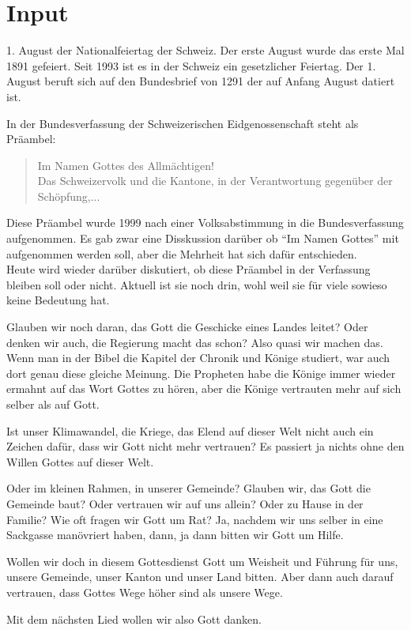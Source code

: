 \documentclass{../../inc/mybib}
\begin{document}
\section{ Input }
\begin{spacing}{1.5}
1. August der Nationalfeiertag der Schweiz. Der erste August wurde das erste Mal 1891 gefeiert. Seit 1993 ist es in der Schweiz ein gesetzlicher Feiertag. Der 1. August beruft sich auf den Bundesbrief von 1291 der auf Anfang August datiert ist.

In der Bundesverfassung der Schweizerischen Eidgenossenschaft steht als Präambel:
\begin{quote}
Im Namen Gottes des Allmächtigen!\\
Das Schweizervolk und die Kantone, in der Verantwortung gegenüber der Schöpfung,...
\end{quote}
Diese Präambel wurde 1999 nach einer Volksabstimmung in die Bundesverfassung aufgenommen. Es gab zwar eine Disskussion darüber ob \enquote{Im Namen Gottes} mit aufgenommen werden soll, aber die Mehrheit hat sich dafür entschieden.\\
Heute wird wieder darüber diskutiert, ob diese Präambel in der Verfassung bleiben soll oder nicht. Aktuell ist sie noch drin, wohl weil sie für viele sowieso keine Bedeutung hat.

Glauben wir noch daran, das Gott die Geschicke eines Landes leitet? Oder denken wir auch, die Regierung macht das schon? Also quasi wir machen das. Wenn man in der Bibel die Kapitel der Chronik und Könige studiert, war auch dort genau diese gleiche Meinung. Die Propheten habe die Könige immer wieder ermahnt auf das Wort Gottes zu hören, aber die Könige vertrauten mehr auf sich selber als auf Gott.

Ist unser Klimawandel, die Kriege, das Elend auf dieser Welt nicht auch ein Zeichen dafür, dass wir Gott nicht mehr vertrauen? Es passiert ja nichts ohne den Willen Gottes auf dieser Welt.

Oder im kleinen Rahmen, in unserer Gemeinde? Glauben wir, das Gott die Gemeinde baut? Oder vertrauen wir auf uns allein? Oder zu Hause in der Familie? Wie oft fragen wir Gott um Rat? Ja, nachdem wir uns selber in eine Sackgasse manövriert haben, dann, ja dann bitten wir Gott um Hilfe.

Wollen wir doch in diesem Gottesdienst Gott um Weisheit und Führung für uns, unsere Gemeinde, unser Kanton und unser Land bitten. Aber dann auch darauf vertrauen, dass Gottes Wege höher sind als unsere Wege.



Mit dem nächsten Lied wollen wir also Gott danken.
\end{spacing}
\end{document}
